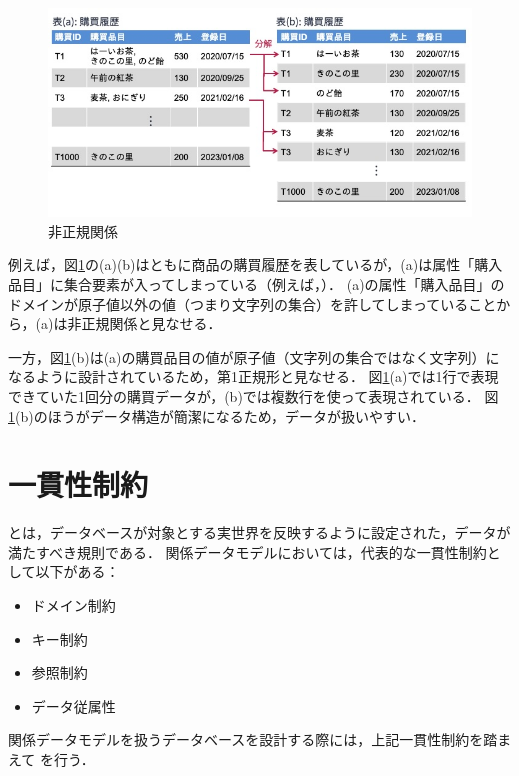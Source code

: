 \begin{figure}[tb]
    \centering
    \includegraphics[width=1.0\textwidth]{figure/unnormalized-relation.jpg}
    \caption{非正規関係}
    \label{fig:unnormalized-relation}
\end{figure}

例えば，図\ref{fig:unnormalized-relation}の(a)(b)はともに商品の購買履歴を表しているが，(a)は属性「購入品目」に集合要素が入ってしまっている（例えば，）．
(a)の属性「購入品目」のドメインが原子値以外の値（つまり文字列の集合）を許してしまっていることから，(a)は非正規関係と見なせる．

一方，図\ref{fig:unnormalized-relation}(b)は(a)の購買品目の値が原子値（文字列の集合ではなく文字列）になるように設計されているため，第1正規形と見なせる．
図\ref{fig:unnormalized-relation}(a)では1行で表現できていた1回分の購買データが，(b)では複数行を使って表現されている．
図\ref{fig:unnormalized-relation}(b)のほうがデータ構造が簡潔になるため，データが扱いやすい．


\section{一貫性制約}
 とは，データベースが対象とする実世界を反映するように設定された，データが満たすべき規則である．
関係データモデルにおいては，代表的な一貫性制約として以下がある：
\begin{itemize}
\item ドメイン制約
\item キー制約
\item 参照制約
\item データ従属性
\end{itemize}

関係データモデルを扱うデータベースを設計する際には，上記一貫性制約を踏まえて を行う．


